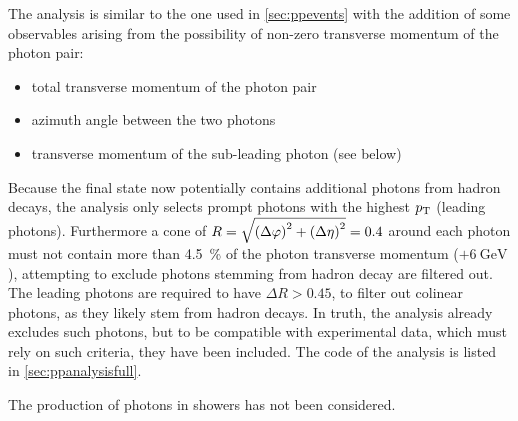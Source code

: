 The analysis is similar to the one used in \cref{sec:ppevents} with
the addition of some observables arising from the possibility of
non-zero transverse momentum of the photon pair:
%
\begin{itemize}
\item total transverse momentum of the photon pair
\item azimuth angle between the two photons
\item transverse momentum of the sub-leading photon (see below)
\end{itemize}
%
Because the final state now potentially contains additional photons
from hadron decays, the analysis only selects prompt photons with the
highest \(p_\mathrm{T}\) (leading photons). Furthermore a cone of
\(R = \sqrt{\qty(\Delta\varphi)^2 + \qty(\Delta\eta)^2} = 0.4\) around
each photon must not contain more than \SI{4.5}{\percent} of the
photon transverse momentum (\(+ \SI{6}{\giga\electronvolt}\)),
attempting to exclude photons stemming from hadron decay are filtered
out. The leading photons are required to have \(\Delta R > 0.45\), to
filter out colinear photons, as they likely stem from hadron
decays. In truth, the analysis already excludes such photons, but to
be compatible with experimental data, which must rely on such
criteria, they have been included. The code of the analysis is listed
in \cref{sec:ppanalysisfull}.

The production of photons in showers has not been considered.


